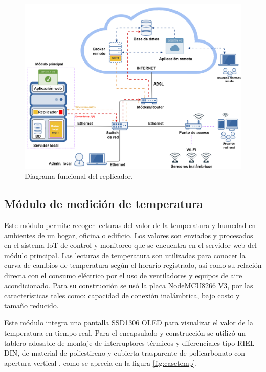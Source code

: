 \begin{figure}[htbp]
	\centering
	\includegraphics[width=1.0\textwidth]{./Figures/diagrama2.png}
	\caption{Diagrama funcional del replicador. }

	\label{fig:logicareplicador}
\end{figure}

\subsection{Módulo de medición de temperatura}

Este módulo permite recoger lecturas del valor de la temperatura y humedad en ambientes de un hogar, oficina o edificio. Los valores son enviados y procesados en el sistema IoT de control y monitoreo que se encuentra en el servidor web del módulo principal. Las lecturas de temperatura son utilizadas para conocer la curva de cambios de temperatura según el horario registrado, así como su relación directa con el consumo eléctrico por el uso de ventiladores y equipos de aire acondicionado. Para su construcción se usó la placa NodeMCU8266 V3, por las características tales como: capacidad de conexión inalámbrica, bajo costo y tamaño reducido. 

Este módulo integra una pantalla SSD1306 OLED para visualizar el valor de la temperatura en tiempo real. Para el encapsulado y construcción se utilizó un tablero adosable de montaje de interruptores térmicos y diferenciales tipo RIEL-DIN, de material de poliestireno y cubierta trasparente de policarbonato con apertura vertical \citep{WEBSITE:17}, como se aprecia en la figura \ref{fig:casetemp}.



